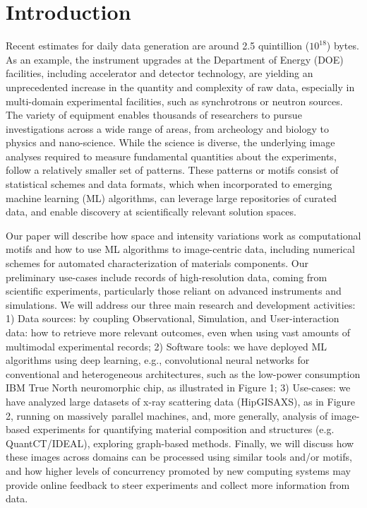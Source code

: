 \documentclass[conference]{IEEEtran}
\begin{document}
\section{Introduction}
Recent estimates for daily data generation are around 2.5 quintillion ($10^{18}$) bytes. As an example, the instrument upgrades at the Department of Energy (DOE) facilities, including accelerator and detector technology, are yielding an unprecedented increase in the quantity and complexity of raw data, especially in multi-domain experimental facilities, such as synchrotrons or neutron sources. The variety of equipment enables thousands of researchers to pursue investigations across a wide range of areas, from archeology and biology to physics and nano-science. While the science is diverse, the underlying image analyses required to measure fundamental quantities about the experiments, follow a
relatively smaller set of patterns. These patterns or motifs consist of statistical schemes and data formats, which when incorporated to emerging machine learning (ML) algorithms, can leverage large repositories of curated data, and enable discovery at scientifically relevant solution spaces.

Our paper will describe how space and intensity variations work as computational motifs and how to use ML algorithms to image-centric data, including numerical schemes for automated characterization of materials components. Our preliminary use-cases include records of high-resolution data, coming from scientific experiments, particularly those reliant on advanced instruments and simulations. We will address our three main research and development activities:
1) Data sources: by coupling Observational, Simulation, and User-interaction data: how to retrieve
more relevant outcomes, even when using vast amounts of multimodal experimental records;
2) Software tools: we have deployed ML algorithms using deep learning, e.g., convolutional neural
networks for conventional and heterogeneous architectures, such as the low-power consumption IBM True
North neuromorphic chip, as illustrated in Figure 1;
3) Use-cases: we have analyzed large datasets of x-ray scattering data (HipGISAXS), as in Figure 2,
running on massively parallel machines, and, more generally, analysis of image-based experiments for
quantifying material composition and structures (e.g. QuantCT/IDEAL), exploring graph-based methods.
Finally, we will discuss how these images across domains can be processed using similar tools and/or
motifs, and how higher levels of concurrency promoted by new computing systems may provide online
feedback to steer experiments and collect more information from data.
\end{document}
